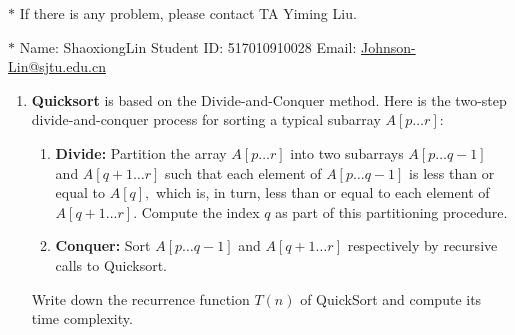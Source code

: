 \documentclass[12pt,a4paper]{article}
\theoremstyle{definition}
\begin{document}
\noindent

\noindent{}
\begin{center}
\footnotesize{\color{red}$*$ If there is any problem, please contact TA Yiming Liu.}

\footnotesize{\color{blue}$*$ Name: ShaoxiongLin  \quad Student ID: 517010910028 \quad Email: \href{mailto:Johnson-Lin@sjtu.edu.cn}{Johnson-Lin@sjtu.edu.cn}}
\end{center}

\begin{enumerate}
    \item
    \textbf{Quicksort} is based on the Divide-and-Conquer method. Here is the two-step divide-and-conquer process for sorting a typical subarray $A[p \ldots r]$:
    \begin{enumerate}

    	\item
    	\textbf{Divide:} Partition the array $A[p \ldots r]$ into two subarrays $A[p \ldots q-1]$ and $A[q+1 \ldots r]$ such that each element of $A[p \ldots q-1]$ is less than or equal to $A[q],$ which is, in turn, less than or equal to each element of $A[q+1 \ldots r].$ Compute the index $q$ as part of this partitioning procedure.
    	
    	\item
    	\textbf{Conquer:} Sort $A[p \ldots q-1]$ and $A[q+1 \ldots r]$ respectively by recursive calls to Quicksort.
    	
    \end{enumerate}
    Write down the recurrence function $T(n)$ of QuickSort and compute its time complexity.


\end{enumerate}
\end{document}
